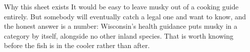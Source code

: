 \begin{telospanel}{Why this sheet exists}
It would be easy to leave musky out of a cooking guide entirely. But somebody will eventually catch a legal one and want to know, and the honest answer is a number: Wisconsin's health guidance puts musky in a category by itself, alongside no other inland species. That is worth knowing before the fish is in the cooler rather than after.
\end{telospanel}



\advisorymusky

